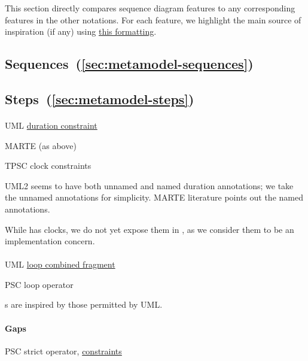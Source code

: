 \newcommand{\insp}[1]{\ul{#1}}

This section directly compares \langname{} sequence diagram features to any
corresponding features in the other notations.
For each feature, we highlight the main source of inspiration (if any)
using \insp{this formatting}.

\subsection{Sequences~(\ref{sec:metamodel-sequences})}

\subsection{Steps~(\ref{sec:metamodel-steps})}

\paragraph{\mdeadlinestep}
\begin{featset}
\item[UML] \insp{duration constraint}
\item[MARTE] (as above)
\item[TPSC] clock constraints
\end{featset}

UML2 seems to have both unnamed and named duration
  annotations; we take the unnamed annotations for simplicity.  MARTE
  literature points out the named annotations.  

  While \robochart{} has clocks, we do not yet expose them in
  \langname, as we consider them to be an implementation concern.
      
\paragraph{\mloopstep}
\begin{featset}
\item[UML] \insp{loop combined fragment}
\item[PSC] loop operator
\end{featset}

\mloopbound s are inspired by those permitted by UML.

\paragraph{Gaps}
\begin{featset}
\item[PSC] strict operator, \insp{constraints}
\end{featset}

